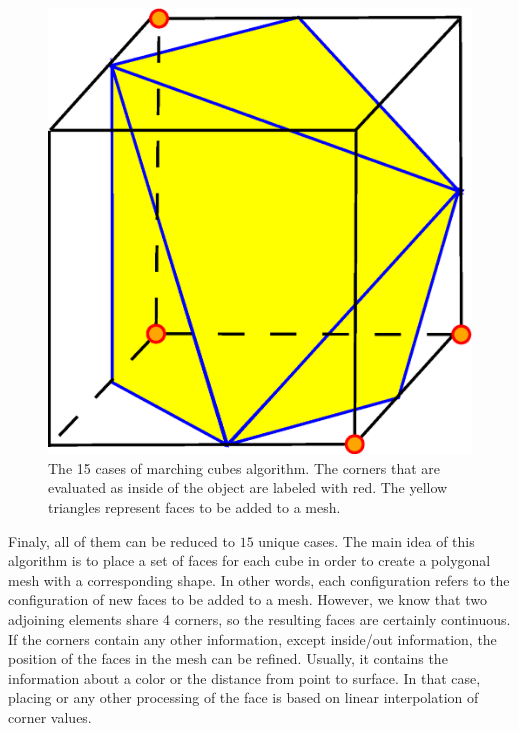 \begin{figure}[ht]
\hspace{3mm}
\includegraphics[scale=0.15]{../img/mar_cub_case14.eps}

\caption{The 15 cases of marching cubes algorithm. The corners that are evaluated as inside of the object
are labeled with red. The yellow triangles represent faces to be added to a mesh.}
\label{fig:mc_cases}
\end{figure}

Finaly, all of them can be reduced to $15$ unique cases. The main idea of this algorithm is to
place a set of faces for each cube in order to create a polygonal mesh with a corresponding shape.
In other words, each configuration refers to the configuration of new faces to be added to a mesh.
However, we know that two adjoining elements share 4 corners, so the resulting faces are certainly
continuous.
If the corners contain any other information, except inside/out information, the position of 
the faces in the mesh can be refined. Usually, it contains the information about a color or
the distance from point to surface. In that case, placing or any other processing of
the face is based on linear interpolation of corner values.\\
\\

